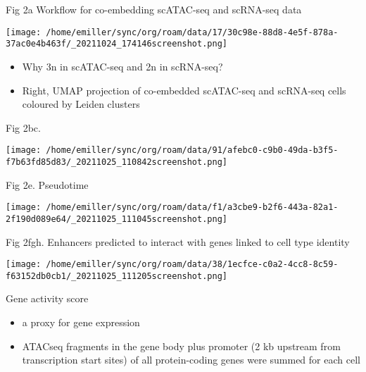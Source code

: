 \documentclass[bigger]{beamer}
\begin{document}
\begin{frame}[label={sec:org3e3f0b9}]{Fig 2a Workflow for co-embedding scATAC-seq and scRNA-seq data}
\begin{center}
\texttt{[image: /home/emiller/sync/org/roam/data/17/30c98e-88d8-4e5f-878a-37ac0e4b463f/\_20211024\_174146screenshot.png]}
\end{center}

\begin{itemize}
\item Why 3n in scATAC-seq and 2n in scRNA-seq?
\item Right, UMAP projection of co-embedded scATAC-seq and scRNA-seq cells
coloured by Leiden clusters
\end{itemize}
\end{frame}

\begin{frame}[label={sec:orge4a3d30}]{Fig 2bc.}
\begin{center}
\texttt{[image: /home/emiller/sync/org/roam/data/91/afebc0-c9b0-49da-b3f5-f7b63fd85d83/\_20211025\_110842screenshot.png]}
\end{center}
\end{frame}

\begin{frame}[label={sec:org21f471c}]{Fig 2e. Pseudotime}
\begin{center}
\texttt{[image: /home/emiller/sync/org/roam/data/f1/a3cbe9-b2f6-443a-82a1-2f190d089e64/\_20211025\_111045screenshot.png]}
\end{center}
\end{frame}


\begin{frame}[label={sec:orgf1dd2d5}]{Fig 2fgh. Enhancers predicted to interact with genes linked to cell type identity}
\begin{center}
\texttt{[image: /home/emiller/sync/org/roam/data/38/1ecfce-c0a2-4cc8-8c59-f63152db0cb1/\_20211025\_111205screenshot.png]}
\end{center}
\end{frame}

\begin{frame}[label={sec:orgac8f13f}]{Gene activity score}
\begin{itemize}
\item a proxy for gene expression
\item ATACseq fragments in the gene body plus promoter (2 kb upstream from
transcription start sites) of all protein-coding genes were summed for each
cell
\end{itemize}
\end{frame}
\end{document}
